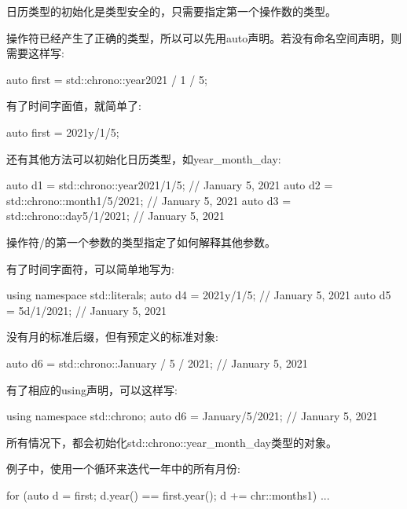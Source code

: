 日历类型的初始化是类型安全的，只需要指定第一个操作数的类型。

操作符已经产生了正确的类型，所以可以先用auto声明。若没有命名空间声明，则需要这样写:

\begin{cpp}
auto first = std::chrono::year{2021} / 1 / 5;
\end{cpp}

有了时间字面值，就简单了:

\begin{cpp}
auto first = 2021y/1/5;
\end{cpp}


还有其他方法可以初始化日历类型，如year\_month\_day:

\begin{cpp}
auto d1 = std::chrono::year{2021}/1/5; // January 5, 2021
auto d2 = std::chrono::month{1}/5/2021; // January 5, 2021
auto d3 = std::chrono::day{5}/1/2021; // January 5, 2021
\end{cpp}

操作符/的第一个参数的类型指定了如何解释其他参数。

有了时间字面符，可以简单地写为:

\begin{cpp}
using namespace std::literals;
auto d4 = 2021y/1/5; // January 5, 2021
auto d5 = 5d/1/2021; // January 5, 2021
\end{cpp}

没有月的标准后缀，但有预定义的标准对象:

\begin{cpp}
auto d6 = std::chrono::January / 5 / 2021; // January 5, 2021
\end{cpp}

有了相应的using声明，可以这样写:

\begin{cpp}
using namespace std::chrono;
auto d6 = January/5/2021; // January 5, 2021
\end{cpp}

所有情况下，都会初始化std::chrono::year\_month\_day类型的对象。


例子中，使用一个循环来迭代一年中的所有月份:

\begin{cpp}
for (auto d = first; d.year() == first.year(); d += chr::months{1}) {
	...
}
\end{cpp}

